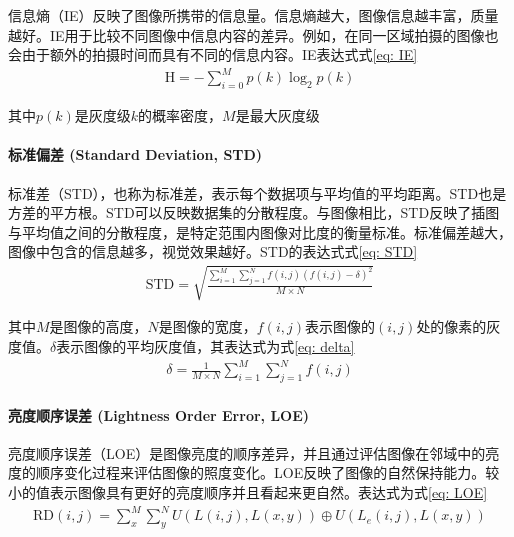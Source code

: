 \documentclass[a4paper]{ctexart}
\begin{document}
	信息熵（IE）反映了图像所携带的信息量。信息熵越大，图像信息越丰富，质量越好。IE用于比较不同图像中信息内容的差异。例如，在同一区域拍摄的图像也会由于额外的拍摄时间而具有不同的信息内容。IE表达式式\ref{eq: IE}
	\begin{equation}
		\begin{aligned}
			\text{H} = -\sum_{i=0}^{M} p(k)\log_{2}p(k)
		\end{aligned}
		\label{eq: IE}
	\end{equation}
	
	其中$p(k)$是灰度级$k$的概率密度，$M$是最大灰度级
	
	\paragraph{标准偏差 (Standard Deviation, STD)}
	
	标准差（STD），也称为标准差，表示每个数据项与平均值的平均距离。STD也是方差的平方根。STD可以反映数据集的分散程度。与图像相比，STD反映了插图与平均值之间的分散程度，是特定范围内图像对比度的衡量标准。标准偏差越大，图像中包含的信息越多，视觉效果越好。STD的表达式式\ref{eq: STD}
	\begin{equation}
		\begin{aligned}
			\text{STD} = \sqrt{\frac{\sum_{i=1}^{M} \sum_{j=1}^{N} f(i,j)\left( f(i,j)-\delta \right)^{2}}{M \times N}}
		\end{aligned}
		\label{eq: STD}
	\end{equation}
	
	其中$M$是图像的高度，$N$是图像的宽度，$f(i, j)$表示图像的$(i, j)$处的像素的灰度值。$\delta$表示图像的平均灰度值，其表达式为式\ref{eq: delta}
	\begin{equation}
		\begin{aligned}
			\delta = \frac{1}{M \times N} \sum_{i=1}^{M} \sum_{j=1}^{N} f(i,j)
		\end{aligned}
		\label{eq: delta}
	\end{equation}
	
	\paragraph{亮度顺序误差 (Lightness Order Error, LOE)}
	
	亮度顺序误差（LOE）是图像亮度的顺序差异，并且通过评估图像在邻域中的亮度的顺序变化过程来评估图像的照度变化。LOE反映了图像的自然保持能力。较小的值表示图像具有更好的亮度顺序并且看起来更自然。表达式为式\ref{eq: LOE}
	\begin{equation}
		\begin{aligned}
			\text{RD}(i,j) = \sum_{x}^{M} \sum_{y}^{N} U\left( L(i,j), L(x,y) \right) \oplus U\left( L_{e}(i,j), L(x,y) \right) 
		\end{aligned}
		\label{eq: LOE}
	\end{equation}
	
\end{document}
